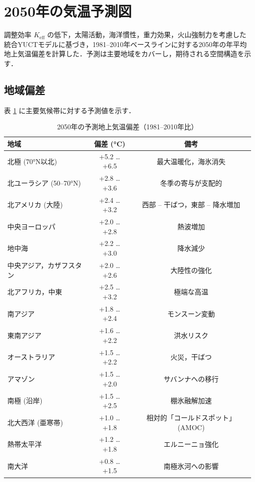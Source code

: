 \documentclass[11pt,a4paper]{article}
\begin{document}
	\section{2050年の気温予測図}
	\label{sec:forecast_maps}
	
	調整効率 $K_{\mathrm{eff}}$ の低下，太陽活動，海洋慣性，重力効果，火山強制力を考慮した統合YUCTモデルに基づき，1981–2010年ベースラインに対する2050年の年平均地上気温偏差を計算した．予測は主要地域をカバーし，期待される空間構造を示す．
	
	\subsection{地域偏差}
	
	表 \ref{tab:anomalies_2050} に主要気候帯に対する予測値を示す．
	
	\begin{table}[htbp]
		\centering
		\caption{2050年の予測地上気温偏差（1981–2010年比）}
		\label{tab:anomalies_2050}
		\small
		\begin{tabular}{p{4.5cm} c c}
			\toprule
			地域 & 偏差 (°C) & 備考 \\
			\midrule
			北極 (70°N以北) & +5.2 … +6.5 & 最大温暖化，海氷消失 \\
			北ユーラシア (50–70°N) & +2.8 … +3.6 & 冬季の寄与が支配的 \\
			北アメリカ (大陸) & +2.4 … +3.2 & 西部 – 干ばつ，東部 – 降水増加 \\
			中央ヨーロッパ & +2.0 … +2.8 & 熱波増加 \\
			地中海 & +2.2 … +3.0 & 降水減少 \\
			中央アジア，カザフスタン & +2.0 … +2.6 & 大陸性の強化 \\
			北アフリカ，中東 & +2.5 … +3.2 & 極端な高温 \\
			南アジア & +1.8 … +2.4 & モンスーン変動 \\
			東南アジア & +1.6 … +2.2 & 洪水リスク \\
			オーストラリア & +1.5 … +2.2 & 火災，干ばつ \\
			アマゾン & +1.5 … +2.0 & サバンナへの移行 \\
			南極 (沿岸) & +1.5 … +2.5 & 棚氷融解加速 \\
			北大西洋 (亜寒帯) & +1.0 … +1.8 & 相対的「コールドスポット」 (AMOC) \\
			熱帯太平洋 & +1.2 … +1.8 & エルニーニョ強化 \\
			南大洋 & +0.8 … +1.5 & 南極氷河への影響 \\
			\bottomrule
		\end{tabular}
	\end{table}
	
\end{document}
